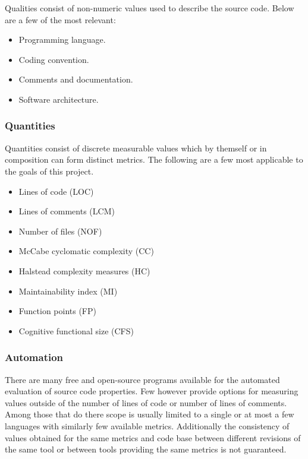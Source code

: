 Qualities consist of non-numeric values used to describe the source code. Below are a few of the most relevant:

\begin{itemize}
    \item Programming language.
    \item Coding convention.
    \item Comments and documentation.
    \item Software architecture.
\end{itemize}

\subsubsection{Quantities}

Quantities consist of discrete measurable values which by themself or in composition can form distinct metrics. The following are a few most applicable to the goals of this project.

\begin{itemize}
    \item Lines of code (LOC) \cite{loc}
    \item Lines of comments (LCM) \cite{lcm-1,lcm-2}
    \item Number of files (NOF) \cite{nof}
    \item McCabe cyclomatic complexity (CC) \cite{mccabe-complexity}
    \item Halstead complexity measures (HC) \cite{halstead-complexity}
    \item Maintainability index (MI) \cite{maintainability-1,maintainability-2}
    \item Function points (FP) \cite{functional-size}
    \item Cognitive functional size (CFS) \cite{cognitive-complexity}
\end{itemize}

\subsubsection{Automation}

There are many free and open-source programs available for the automated evaluation of source code properties. Few however provide options for measuring values outside of the number of lines of code or number of lines of comments. Among those that do there scope is usually limited to a single or at most a few languages with similarly few available metrics. Additionally the consistency of values obtained for the same metrics and code base between different revisions of the same tool or between tools providing the same metrics is not guaranteed.

